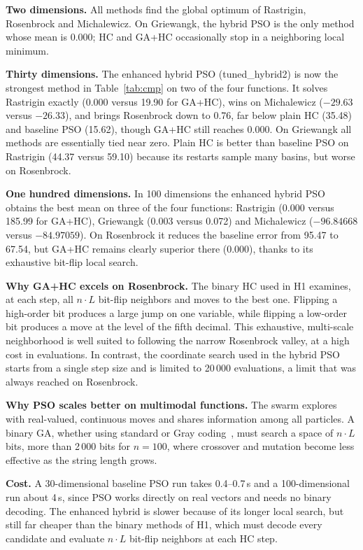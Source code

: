 \documentclass[conference]{IEEEtran}
\begin{document}
\textbf{Two dimensions.} All methods find the global optimum of
Rastrigin, Rosenbrock and Michalewicz. On Griewangk, the hybrid PSO is the
only method whose mean is 0.000; HC and GA+HC occasionally stop in a
neighboring local minimum.

\textbf{Thirty dimensions.} The enhanced hybrid PSO (tuned\_hybrid2) is now
the strongest method in Table~\ref{tab:cmp} on two of the four functions. It solves Rastrigin
exactly (0.000 versus 19.90 for GA+HC), wins on Michalewicz ($-29.63$
versus $-26.33$), and brings Rosenbrock down to 0.76, far below plain HC
(35.48) and baseline PSO (15.62), though GA+HC still reaches 0.000. On
Griewangk all methods are essentially tied near zero. Plain HC is better
than baseline PSO on Rastrigin (44.37 versus 59.10) because its restarts
sample many basins, but worse on Rosenbrock.

\textbf{One hundred dimensions.} In 100 dimensions the enhanced hybrid PSO
obtains the best mean on three of the four functions: Rastrigin (0.000
versus 185.99 for GA+HC), Griewangk (0.003 versus 0.072) and Michalewicz
($-96.84668$ versus $-84.97059$). On
Rosenbrock it reduces the baseline error from 95.47 to 67.54, but GA+HC
remains clearly superior there (0.000), thanks to its exhaustive bit-flip
local search.

\textbf{Why GA+HC excels on Rosenbrock.} The binary HC used in H1 examines,
at each step, all $n\cdot L$ bit-flip neighbors and moves to the best one.
Flipping a high-order bit produces a large jump on one variable, while
flipping a low-order bit produces a move at the level of the fifth
decimal. This exhaustive, multi-scale neighborhood is well suited to
following the narrow Rosenbrock valley, at a high cost in evaluations. In
contrast, the coordinate search used in the hybrid PSO starts from a
single step size and is limited to 20\,000 evaluations, a limit that was
always reached on Rosenbrock.

\textbf{Why PSO scales better on multimodal functions.} The swarm
explores with real-valued, continuous moves and shares information among
all particles. A binary GA, whether using standard or Gray
coding~\cite{caruana1988}, must search a space of $n\cdot L$ bits, more
than 2\,000 bits for $n=100$, where crossover and mutation become less
effective as the string length grows.

\textbf{Cost.} A 30-dimensional baseline PSO run takes 0.4--0.7\,s and a
100-dimensional run about 4\,s, since PSO works directly on real vectors
and needs no binary decoding. The enhanced hybrid is slower because of its
longer local search, but still far cheaper than the binary methods of H1,
which must decode every candidate and evaluate $n\cdot L$ bit-flip
neighbors at each HC step.
\end{document}
